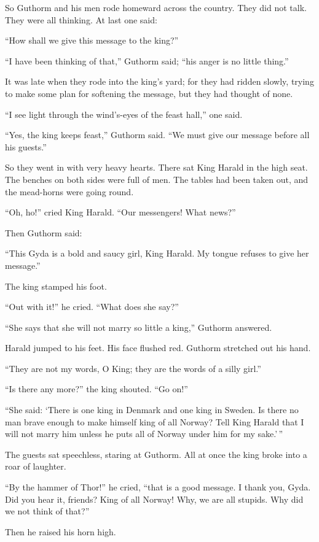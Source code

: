 So Guthorm and his men rode homeward across the country. They did not
talk. They were all thinking. At last one said:

``How shall we give this message to the king?''

``I have been thinking of that,'' Guthorm said; ``his anger is no little
thing.''

It was late when they rode into the king's yard; for they had ridden
slowly, trying to make some plan for softening the message, but they had
thought of none.

``I see light through the wind's-eyes of the feast hall,'' one said.

``Yes, the king keeps feast,'' Guthorm said. ``We must give our message
before all his guests.''

So they went in with very heavy hearts. There sat King Harald in the
high seat. The benches on both sides were full of men. The tables had
been taken out, and the mead-horns were going round.

``Oh, ho!'' cried King Harald. ``Our messengers! What news?''

Then Guthorm said:

``This Gyda is a bold and saucy girl, King Harald. My tongue refuses to
give her message.''

The king stamped his foot.

``Out with it!'' he cried. ``What does she say?''

``She says that she will not marry so little a king,'' Guthorm answered.

Harald jumped to his feet. His face flushed red. Guthorm stretched out
his hand.

``They are not my words, O King; they are the words of a silly girl.''

``Is there any more?'' the king shouted. ``Go on!''

``She said: `There is one king in Denmark and one king in Sweden. Is
there no man brave enough to make himself king of all Norway? Tell King
Harald that I will not marry him unless he puts all of Norway under him
for my sake.'\,''

The guests sat speechless, staring at Guthorm. All at once the king
broke into a roar of laughter.

``By the hammer of Thor!'' he cried, ``that is a good message. I thank
you, Gyda. Did you hear it, friends? King of all Norway! Why, we are all
stupids. Why did we not think of that?''

Then he raised his horn high.

